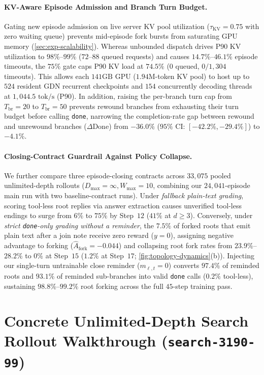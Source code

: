 \documentclass{article}
\begin{document}
\paragraph{KV-Aware Episode Admission and Branch Turn Budget.}
Gating new episode admission on live server KV pool utilization ($\tau_{\text{KV}} = 0.75$ with zero waiting queue) prevents mid-episode fork bursts from saturating GPU memory (\cref{sec:exp-scalability}). Whereas unbounded dispatch drives P90 KV utilization to $98\%$--$99\%$ ($72$--$88$ queued requests) and causes $14.7\%$--$46.1\%$ episode timeouts, the $75\%$ gate caps P90 KV load at $74.5\%$ ($0$ queued, $0 / 1{,}304$ timeouts). This allows each $141\text{GB}$ GPU ($1.94\text{M}$-token KV pool) to host up to $524$ resident GDN recurrent checkpoints and $154$ concurrently decoding threads at $1{,}044.5\text{ tok/s}$ (P90). In addition, raising the per-branch turn cap from $T_{\text{br}}=20$ to $T_{\text{br}}=50$ prevents rewound branches from exhausting their turn budget before calling \texttt{done}, narrowing the completion-rate gap between rewound and unrewound branches ($\Delta\text{Done}$) from $-36.0\%$ ($95\%$ CI: $[-42.2\%, -29.4\%]$) to $-4.1\%$.

\paragraph{Closing-Contract Guardrail Against Policy Collapse.}
We further compare three episode-closing contracts across $33{,}075$ pooled unlimited-depth rollouts ($D_{\max}=\infty, W_{\max}=10$, combining our $24{,}041$-episode main run with two baseline-contract runs). Under \emph{fallback plain-text grading}, scoring tool-less root replies via answer extraction causes unverified tool-less endings to surge from $6\%$ to $75\%$ by Step~$12$ ($41\%$ at $d \ge 3$). Conversely, under \emph{strict \texttt{done}-only grading without a reminder}, the $7.5\%$ of forked roots that emit plain text after a join note receive zero reward ($y=0$), assigning negative advantage to forking ($\hat{A}_{\text{fork}} = -0.044$) and collapsing root fork rates from $23.9\%$--$28.2\%$ to $0\%$ at Step~$15$ ($1.2\%$ at Step~$17$; \cref{fig:topology-dynamics}(b)). Injecting our single-turn untrainable close reminder ($m_{\ell,t}=0$) converts $97.4\%$ of reminded roots and $93.1\%$ of reminded sub-branches into valid \texttt{done} calls ($0.2\%$ tool-less), sustaining $98.8\%$--$99.2\%$ root forking across the full $45$-step training pass.

\section{Concrete Unlimited-Depth Search Rollout Walkthrough (\texttt{search-3190-99})}
\label{app:rollout-case}
\end{document}
